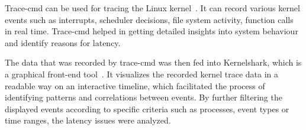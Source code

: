 \documentclass[MMR,Master,english]{twbook}
\begin{document}

\bigskip \noindent Trace-cmd can be used for tracing the Linux kernel~\cite{Tracecmd}. It can record various kernel events such as interrupts, scheduler decisions, file system activity, function calls in real time. Trace-cmd helped in getting detailed insights into system behaviour and identify reasons for latency.

\bigskip \noindent The data that was recorded by trace-cmd was then fed into Kernelshark, which is a graphical front-end tool~\cite{KernelShark}. It visualizes the recorded kernel trace data in a readable way on an interactive timeline, which facilitated the process of identifying patterns and correlations between events. By further filtering the displayed events according to specific criteria such as processes, event types or time ranges, the latency issues were analyzed.
\end{document}
